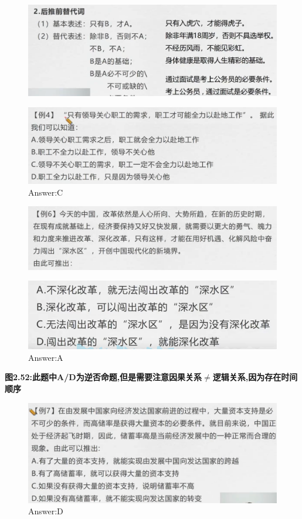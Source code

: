 \documentclass{article}
\numberwithin{equation}{section}						%
\numberwithin{figure}{section}							%
\begin{document}
\begin{sloppypar}
\begin{figure}[H]
     \centering
     \includegraphics[width=0.6\linewidth]{153.png}
\end{figure}


\begin{figure}[H]
     \centering
     \includegraphics[width=0.6\linewidth]{154.png}
	\caption{Answer:C}
\end{figure}

\begin{figure}[H]
     \centering
     \includegraphics[width=0.6\linewidth]{155.png}
\end{figure}

\begin{figure}[H]
     \centering
     \includegraphics[width=0.6\linewidth]{156.png}
	\caption{Answer:A}
\end{figure}


\textbf{图2.52:此题中A/D为逆否命题,但是需要注意因果关系$\neq$逻辑关系,因为存在时间顺序}

\begin{figure}[H]
     \centering
     \includegraphics[width=0.6\linewidth]{157.png}
	\caption{Answer:D}
\end{figure}


\end{sloppypar}
\end{document}
